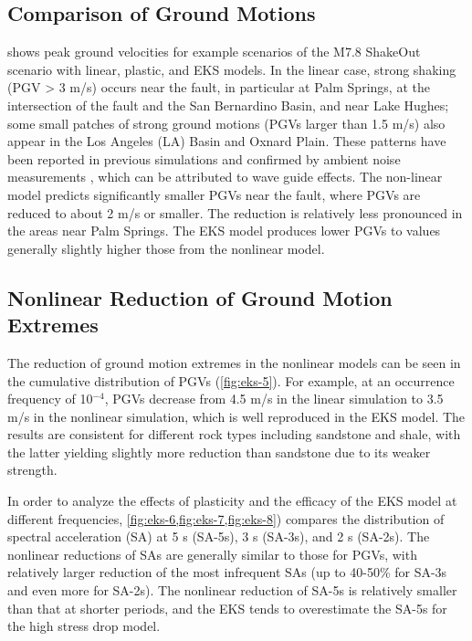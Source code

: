 \subsection{Comparison of Ground Motions}
 shows peak ground velocities for example scenarios of the M7.8 ShakeOut scenario with linear, plastic, and EKS models. In the linear case, strong shaking (PGV > 3 m/s) occurs near the fault, in particular at Palm Springs, at the intersection of the fault and the San Bernardino Basin, and near Lake Hughes; some small patches of strong ground motions (PGVs larger than 1.5 m/s) also appear in the Los Angeles (LA) Basin and Oxnard Plain. These patterns have been reported in previous simulations \citep{olsen2009shakeout} and confirmed by ambient noise measurements \citep{denolle2014strong}, which can be attributed to wave guide effects. The non-linear model predicts significantly smaller PGVs near the fault, where PGVs are reduced to about 2 m/s or smaller. The reduction is relatively less pronounced in the areas near Palm Springs. The EKS model produces lower PGVs to values generally slightly higher those from the nonlinear model.

\subsection{Nonlinear Reduction of Ground Motion Extremes}
The reduction of ground motion extremes in the nonlinear models can be seen in the cumulative distribution of PGVs (\cref{fig:eks-5}). For example, at an occurrence frequency of 10$^{-4}$, PGVs decrease from 4.5 m/s in the linear simulation to 3.5 m/s in the nonlinear simulation, which is well reproduced in the EKS model. The results are consistent for different rock types including sandstone and shale, with the latter yielding slightly more reduction than sandstone due to its weaker strength.

In order to analyze the effects of plasticity and the efficacy of the EKS model at different frequencies, \cref{fig:eks-6,fig:eks-7,fig:eks-8}) compares the  distribution of spectral acceleration (SA) at 5 s (SA-5s), 3 s (SA-3s), and 2 s (SA-2s). The nonlinear reductions of SAs are generally similar to those for PGVs, with relatively larger reduction of the most infrequent SAs (up to 40-50\% for SA-3s and even more for SA-2s). The nonlinear reduction of SA-5s is relatively smaller than that at shorter periods, and the EKS tends to overestimate the SA-5s for the high stress drop model.

